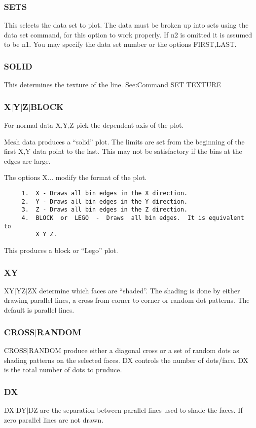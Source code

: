 \subsubsection{SETS}
This  selects  the  data  set to plot.  The data must be broken up into
sets using the data set command, for this option to work properly.   If
n2  is  omitted  it  is assumed to be n1.  You may specify the data set
number or the options FIRST,LAST.  
\subsubsection{SOLID}
This determines the texture of the line.  See:Command SET TEXTURE 
\subsubsection{X$|$Y$|$Z$|$BLOCK}
For normal data X,Y,Z pick the dependent axis of the plot.  

Mesh  data  produces  a  ``solid''  plot.   The  limits  are set from the
beginning of the first X,Y data point to the last.   This  may  not  be
satisfactory if the bins at the edges are large.  

The options X...  modify the format of the plot.  
\begin{verbatim}
     1.  X - Draws all bin edges in the X direction.  
     2.  Y - Draws all bin edges in the Y direction.  
     3.  Z - Draws all bin edges in the Z direction.  
     4.  BLOCK  or  LEGO  -  Draws  all bin edges.  It is equivalent to
         X Y Z.  
\end{verbatim}
This produces a block or ``Lego'' plot.  
\subsubsection{XY}
XY$|$YZ$|$ZX  determine  which  faces are ``shaded''.  The shading is done by
either drawing parallel lines, a cross from corner to corner or  random
dot patterns.  The default is parallel lines.  
\subsubsection{CROSS$|$RANDOM}
CROSS$|$RANDOM produce either a diagonal cross or a set of random dots as
shading patterns on the selected faces.   DX  controls  the  number  of
dots/face.  DX is the total number of dots to pruduce.  
\subsubsection{DX}
DX$|$DY$|$DZ  are  the  separation between parallel lines used to shade the
faces.  If zero parallel lines are not drawn.  


